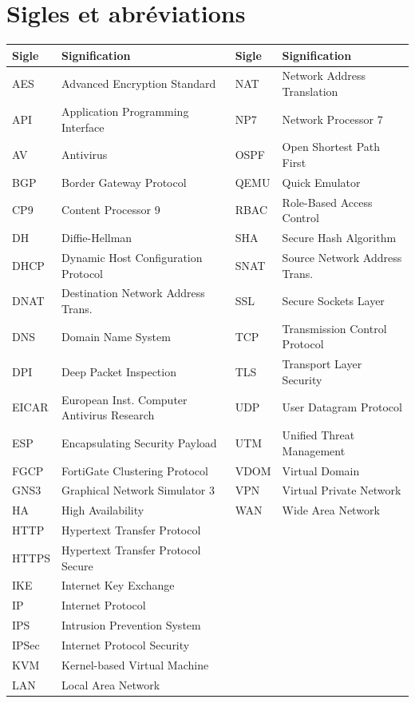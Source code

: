 \chapter*{Sigles et abréviations}

\vspace{0.5em}

{\footnotesize
\noindent
\begin{tabular*}{\textwidth}{@{\extracolsep{\fill}}llll@{}}
\toprule
\textbf{Sigle} & \textbf{Signification} & \textbf{Sigle} & \textbf{Signification} \\
\midrule
AES & Advanced Encryption Standard & NAT & Network Address Translation \\
API & Application Programming Interface & NP7 & Network Processor 7 \\
AV & Antivirus & OSPF & Open Shortest Path First \\
BGP & Border Gateway Protocol & QEMU & Quick Emulator \\
CP9 & Content Processor 9 & RBAC & Role-Based Access Control \\
DH & Diffie-Hellman & SHA & Secure Hash Algorithm \\
DHCP & Dynamic Host Configuration Protocol & SNAT & Source Network Address Trans. \\
DNAT & Destination Network Address Trans. & SSL & Secure Sockets Layer \\
DNS & Domain Name System & TCP & Transmission Control Protocol \\
DPI & Deep Packet Inspection & TLS & Transport Layer Security \\
EICAR & European Inst. Computer Antivirus Research & UDP & User Datagram Protocol \\
ESP & Encapsulating Security Payload & UTM & Unified Threat Management \\
FGCP & FortiGate Clustering Protocol & VDOM & Virtual Domain \\
GNS3 & Graphical Network Simulator 3 & VPN & Virtual Private Network \\
HA & High Availability & WAN & Wide Area Network \\
HTTP & Hypertext Transfer Protocol & & \\
HTTPS & Hypertext Transfer Protocol Secure & & \\
IKE & Internet Key Exchange & & \\
IP & Internet Protocol & & \\
IPS & Intrusion Prevention System & & \\
IPSec & Internet Protocol Security & & \\
KVM & Kernel-based Virtual Machine & & \\
LAN & Local Area Network & & \\
\bottomrule
\end{tabular*}
}
